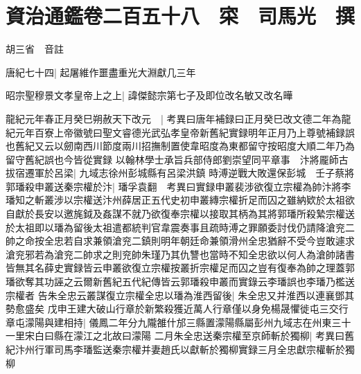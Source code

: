 \section{資治通鑑卷二百五十八　寀　司馬光　撰}

胡三省　音註

唐紀七十四|{
	起屠維作噩盡重光大淵獻几三年}


昭宗聖穆景文孝皇帝上之上|{
	諱傑懿宗第七子及即位改名敏又改名曄}


龍紀元年春正月癸巳朔赦天下改元　|{
	考異曰唐年補録曰正月癸巳改文德二年為龍紀元年百寮上帝徽號曰聖文睿德光武弘孝皇帝新舊紀實録明年正月乃上尊號補録誤也舊紀又云以劒南西川節度兩川招撫制置使韋昭度為東都留守按昭度大順二年乃為留守舊紀誤也今皆從實録}
以翰林學士承旨兵部侍郎劉崇望同平章事　汴將龎師古拔宿遷軍於呂梁|{
	九域志徐州彭城縣有呂梁洪鎮}
時溥逆戰大敗還保彭城　壬子蔡將郭璠殺申叢送秦宗權於汴|{
	璠孚袁翻　考異曰實録申叢裴涉欲復立宗權為帥汴將李璠知之斬叢涉以宗權送汴州薛居正五代史初申叢縳宗權折足而囚之雖納欵於太祖欲自獻於長安以邀旄鉞及姦謀不就乃欲復奉宗權以接取其柄為其將郭璠所殺縶宗權送於太祖即以璠為留後太祖遣都統判官韋震奏事且疏時溥之罪願委討伐仍請降滄兖二帥之命按全忠若自求兼領滄兖二鎮則明年朝廷命兼領滑州全忠猶辭不受今豈敢遽求滄兖邪若為滄兖二帥求之則兖帥朱瑾乃其仇讐也當時不知全忠欲以何人為滄帥諸書皆無其名薛史實録皆云申叢欲復立宗權按叢折宗權足而囚之豈有復奉為帥之理蓋郭璠欲奪其功誣之云爾新舊紀五代紀傳皆云郭璠殺申叢而實錄云李璠誤也李璠乃檻送宗權者}
告朱全忠云叢謀復立宗權全忠以璠為淮西留後|{
	朱全忠又并淮西以連襄鄧其勢愈盛矣}
戊申王建大破山行章於新繁殺獲近萬人行章僅以身免楊晟懼徙屯三交行章屯濛陽與建相持|{
	儀鳳二年分九隴雒什邡三縣置濛陽縣屬彭州九域志在州東三十一里宋白曰縣在濛江之北故曰濛陽}
二月朱全忠送秦宗權至京師斬於獨柳|{
	考異曰舊紀汴州行軍司馬李璠監送秦宗權并妻趙氏以獻斬於獨柳實録三月全忠獻宗權斬於獨柳}


